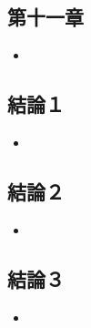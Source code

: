 \subsection{第十一章}\label{ux7b2cux5341ux4e00ux7ae0}

\begin{itemize}
\tightlist
\item
\end{itemize}

\subsection{結論１}\label{ux7d50ux8ad6uxff11}

\begin{itemize}
\tightlist
\item
\end{itemize}

\subsection{結論２}\label{ux7d50ux8ad6uxff12}

\begin{itemize}
\tightlist
\item
\end{itemize}

\subsection{結論３}\label{ux7d50ux8ad6uxff13}

\begin{itemize}
\tightlist
\item
\end{itemize}
